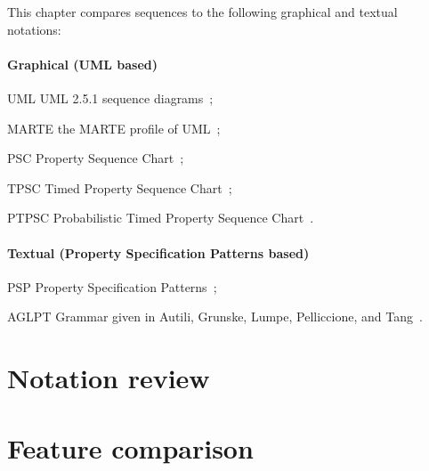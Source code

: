
This chapter compares \langname{} sequences to the following graphical
and textual notations:

\newcommand{\featname}[1]{\textsf{#1}}

\paragraph{Graphical (UML based)}

\begin{featset}
\item[UML] UML 2.5.1 sequence diagrams~\cite{uml251};
\item[MARTE] the MARTE profile of UML~\cite{marte12};
\item[PSC] Property Sequence Chart~\cite{psc};
\item[TPSC] Timed Property Sequence Chart~\cite{tpsc};
\item[PTPSC] Probabilistic Timed Property Sequence Chart~\cite{ptpsc}.
\end{featset}

\paragraph{Textual (Property Specification Patterns based)}

\begin{featset}
\item[PSP] Property Specification Patterns~\cite{psp,pspsite};
\item[AGLPT] Grammar given in Autili, Grunske, Lumpe, Pelliccione, and Tang~\cite{aglpt}.
\end{featset}

\section{Notation review}\label{sec:seq-comparison-review}


\section{Feature comparison}\label{sec:seq-comparison-features}


